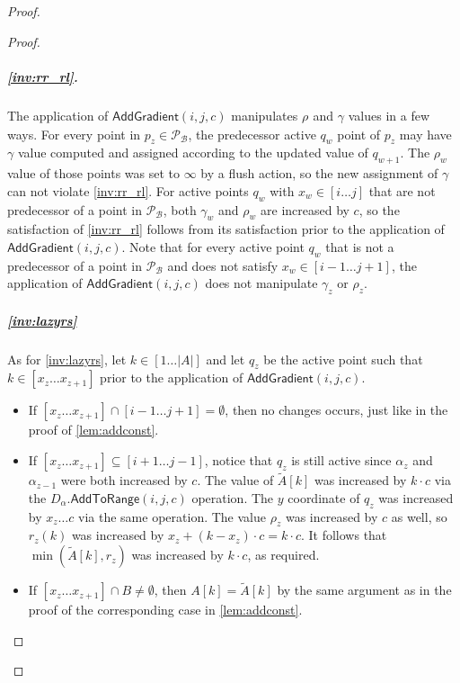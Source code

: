 \documentclass[10pt,a4paper]{article}
\newcommand{\AtR}{\mathsf{AddToRange}}
\newcommand{\AG}{\mathsf{AddGradient}}
\renewcommand{\P}{\mathcal{P}}
\newcommand{\DAL}{D_{\alpha}}
\newcommand{\TA}{\tilde{A}}
\newcommand{\para}[1]{\vspace{-0.1in} \subparagraph*{#1}}
\newcommand{\B}{\mathcal{B}}
\newcommand{\ray}{r}
\newcommand{\rl}[1]{\rho_{#1}}
\begin{document}
\begin{proof}
\begin{proof}
\para{\cref{inv:rr_rl}.}
The application of $\AG(i,j,c)$ manipulates $\rl{}$ and $\gamma$ values in a few ways.
For every point in $p_z \in \P_{\B}$, the predecessor active $q_w$ point of $p_z$ may have $\gamma$ value computed and assigned according to the updated value of $q_{w+1}$.
The $\rl{w}$ value of those points was set to $\infty$ by a flush action, so the new assignment of $\gamma$ can not violate \cref{inv:rr_rl}.
For active points $q_w$ with $x_w \in [i\ldots j]$ that are not predecessor of a point in $\P_{\B}$, both $\gamma_w$ and $\rl{w}$ are increased by $c$, so the satisfaction of \cref{inv:rr_rl} follows from its satisfaction prior to the application of $\AG(i,j,c)$.
Note that for every active point $q_w$ that is not a predecessor of a point in $\P_{\B}$ and does not satisfy $x_w \in [i-1\ldots j+1]$, the application of $\AG(i,j,c)$ does not manipulate $\gamma_z$ or $\rl{z}$.
\para{\cref{inv:lazyrs}}
\fi

As for \cref{inv:lazyrs},
let $k\in [1\ldots |A|]$ and let $q_z$ be the active point such that $k\in [x_z \ldots x_{z+1}]$ prior to the application of $\AG(i,j,c)$.
\begin{itemize}
    \item If $[x_z \ldots x_{z+1}] \cap [i-1\ldots j + 1] = \emptyset$, 
 then no changes occurs, just like in the proof of \cref{lem:addconst}.
    \item If $[x_z \ldots x_{z+1}] \subseteq [i+1 \ldots j-1]$, notice that $q_z$ is still active since $\alpha_z$ and $\alpha_{z-1}$ were both increased by $c$.
    The value of $\TA[k]$ was increased by $k \cdot c$ via the $\DAL.\AtR(i,j,c)$ operation.
    The $y$ coordinate of $q_z$ was increased by $x_z \ldots c$ via the same operation. 
    The value $\rl{z}$ was increased by $c$ as well, so $\ray_z(k)$ was increased by $x_z + (k-x_z) \cdot c = k\cdot c$.
    It follows that $\min(\TA[k],\ray_z)$ was increased by $k\cdot c$, as required.
    \item If $[x_z \ldots x_{z+1}] \cap B \neq \emptyset$, then $A[k]=\TA[k]$ by the same argument as in the proof of the corresponding case in \cref{lem:addconst}.\qedhere 
\end{itemize}
\end{proof}


\end{proof}
\end{document}
